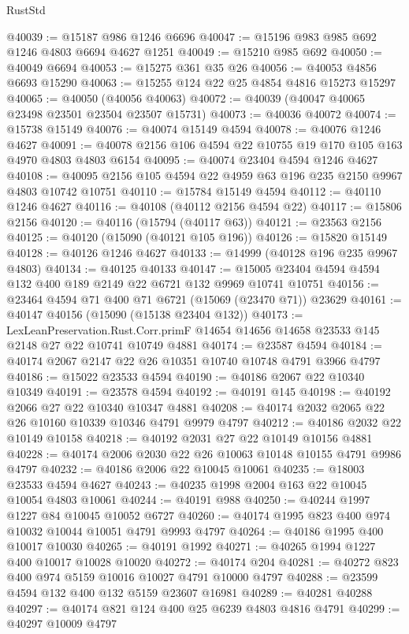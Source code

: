 \begin{lexlean}{RustStd}
\begin{coremodule}
@40039 := @15187 @986 @1246 @6696
@40047 := @15196 @983 @985 @692 @1246 @4803 @6694 @4627 @1251
@40049 := @15210 @985 @692
@40050 := @40049 @6694
@40053 := @15275 @361 @35 @26
@40056 := @40053 @4856 @6693 @15290
@40063 := @15255 @124 @22 @25 @4854 @4816 @15273 @15297
@40065 := @40050 (@40056 @40063)
@40072 := @40039 (@40047 @40065 @23498 @23501 @23504 @23507 @15731)
@40073 := @40036 @40072
@40074 := @15738 @15149
@40076 := @40074 @15149 @4594
@40078 := @40076 @1246 @4627
@40091 := @40078 @2156 @106 @4594 @22 @10755 @19 @170 @105 @163 @4970 @4803 @4803 @6154
@40095 := @40074 @23404 @4594 @1246 @4627
@40108 := @40095 @2156 @105 @4594 @22 @4959 @63 @196 @235 @2150 @9967 @4803 @10742 @10751
@40110 := @15784 @15149 @4594
@40112 := @40110 @1246 @4627
@40116 := @40108 (@40112 @2156 @4594 @22)
@40117 := @15806 @2156
@40120 := @40116 (@15794 (@40117 @63))
@40121 := @23563 @2156
@40125 := @40120 (@15090 (@40121 @105 @196))
@40126 := @15820 @15149
@40128 := @40126 @1246 @4627
@40133 := @14999 (@40128 @196 @235 @9967 @4803)
@40134 := @40125 @40133
@40147 := @15005 @23404 @4594 @4594 @132 @400 @189 @2149 @22 @6721 @132 @9969 @10741 @10751
@40156 := @23464 @4594 @71 @400 @71 @6721 (@15069 (@23470 @71)) @23629
@40161 := @40147 @40156 (@15090 (@15138 @23404 @132))
@40173 := LexLeanPreservation.Rust.Corr.primF
    @14654
    @14656
    @14658
    @23533
    @145
    @2148
    @27
    @22
    @10741
    @10749
    @4881
@40174 := @23587 @4594
@40184 := @40174 @2067 @2147 @22 @26 @10351 @10740 @10748 @4791 @3966 @4797
@40186 := @15022 @23533 @4594
@40190 := @40186 @2067 @22 @10340 @10349
@40191 := @23578 @4594
@40192 := @40191 @145
@40198 := @40192 @2066 @27 @22 @10340 @10347 @4881
@40208 := @40174 @2032 @2065 @22 @26 @10160 @10339 @10346 @4791 @9979 @4797
@40212 := @40186 @2032 @22 @10149 @10158
@40218 := @40192 @2031 @27 @22 @10149 @10156 @4881
@40228 := @40174 @2006 @2030 @22 @26 @10063 @10148 @10155 @4791 @9986 @4797
@40232 := @40186 @2006 @22 @10045 @10061
@40235 := @18003 @23533 @4594 @4627
@40243 := @40235 @1998 @2004 @163 @22 @10045 @10054 @4803 @10061
@40244 := @40191 @988
@40250 := @40244 @1997 @1227 @84 @10045 @10052 @6727
@40260 := @40174 @1995 @823 @400 @974 @10032 @10044 @10051 @4791 @9993 @4797
@40264 := @40186 @1995 @400 @10017 @10030
@40265 := @40191 @1992
@40271 := @40265 @1994 @1227 @400 @10017 @10028 @10020
@40272 := @40174 @204
@40281 := @40272 @823 @400 @974 @5159 @10016 @10027 @4791 @10000 @4797
@40288 := @23599 @4594 @132 @400 @132 @5159 @23607 @16981
@40289 := @40281 @40288
@40297 := @40174 @821 @124 @400 @25 @6239 @4803 @4816 @4791
@40299 := @40297 @10009 @4797

\end{coremodule}
\end{lexlean}

